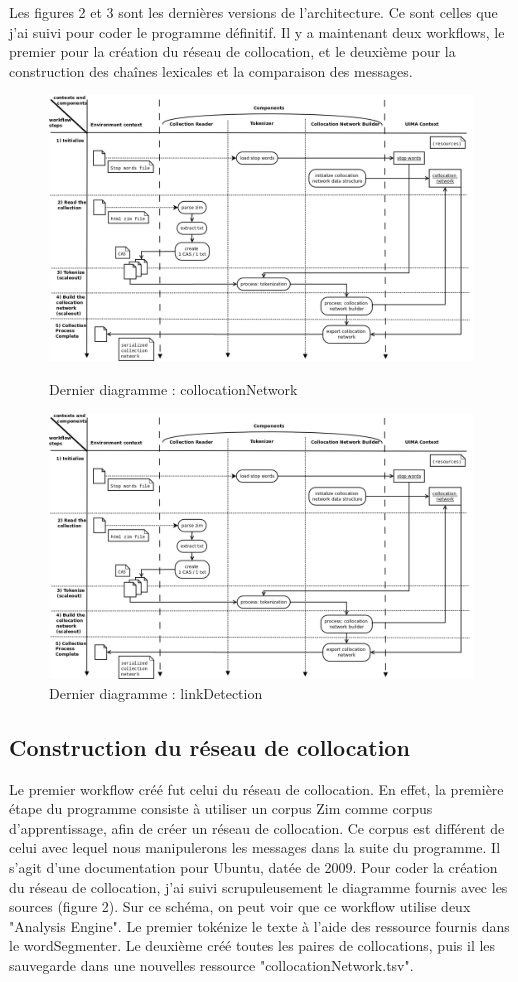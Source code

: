 \documentclass[a4paper]{article}
\begin{document}
Les figures 2 et 3 sont les dernières versions de l'architecture. Ce sont celles que j'ai suivi pour coder le programme définitif. Il y a maintenant deux workflows, le premier pour la création du réseau de collocation, et le deuxième pour la construction des chaînes lexicales et la comparaison des messages.
	
	\begin{figure}[!]
  	\centering
  	\includegraphics[width=1\textwidth]{Figures/cn.png}
  	\caption{Dernier diagramme : collocationNetwork}
  	\includegraphics[width=1\textwidth]{Figures/cn.png}
  	\caption{Dernier diagramme : linkDetection}
	\end{figure}
	
	
	\subsection{Construction du réseau de collocation}
	
	Le premier workflow créé fut celui du réseau de collocation. En effet, la première étape du programme consiste à utiliser un corpus Zim comme corpus d'apprentissage, afin de créer un réseau de collocation. Ce corpus est différent de celui avec lequel nous manipulerons les messages dans la suite du programme. Il s'agit d'une documentation pour Ubuntu, datée de 2009. Pour coder la création du réseau de collocation, j'ai suivi scrupuleusement le diagramme fournis avec les sources (figure 2). Sur ce schéma, on peut voir que ce workflow utilise deux "Analysis Engine". Le premier tokénize le texte à l'aide des ressource fournis dans le wordSegmenter. Le deuxième créé toutes les paires de collocations, puis il les sauvegarde dans une nouvelles ressource "collocationNetwork.tsv".
\end{document}
